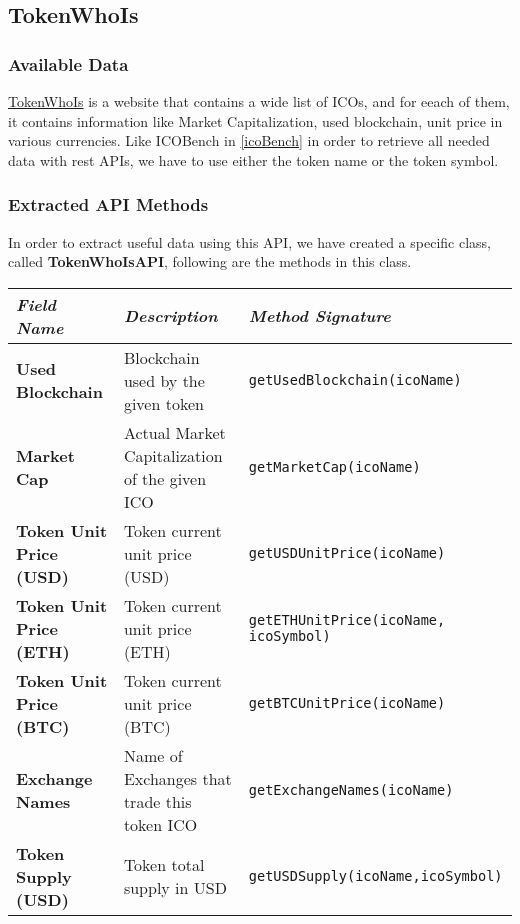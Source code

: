 \subsection{TokenWhoIs}
\subsubsection{Available Data}
\href{https://tokenwhois.com/}{TokenWhoIs} is a website that contains a wide list of ICOs, and for eeach of them, it contains information like Market Capitalization, used blockchain, unit price in various currencies. \newline
Like ICOBench in \ref{icoBench} in order to retrieve all needed data with rest APIs, we have to use  either the token name or the token symbol. 
\subsubsection{Extracted API Methods}
In order to extract useful data using this API, we have created a specific class, called \textbf{TokenWhoIsAPI}, following are the methods in this class.
\begin{center}
\begin{tabular}{| C{2cm} | C{4cm} | C{7cm} |} \hline
    \textit{Field Name} & \textit{Description} & \textit{Method Signature}\\ \hline 
    \textbf{Used Blockchain} & Blockchain used by the given token & \texttt{getUsedBlockchain(icoName)}\\ \hline 
    \textbf{Market Cap} & Actual Market Capitalization of the given ICO &
    \texttt{getMarketCap(icoName)}\\ \hline
    \textbf{Token Unit Price (USD)} & Token current unit price (USD) &
    \texttt{getUSDUnitPrice(icoName)
    }\\ \hline
    \textbf{Token Unit Price (ETH)} & Token current unit price (ETH) &
    \texttt{getETHUnitPrice(icoName, icoSymbol)}\\ \hline 
    \textbf{Token Unit Price (BTC)} & Token current unit price (BTC) &
    \texttt{getBTCUnitPrice(icoName)}\\ \hline 
    \textbf{Exchange Names} & Name of Exchanges that trade this token ICO &
    \texttt{getExchangeNames(icoName)}\\ \hline 
    \textbf{Token Supply (USD)} & Token total supply in USD &
    \texttt{getUSDSupply(icoName,icoSymbol)}\\ \hline
\end{tabular}
\end{center}


